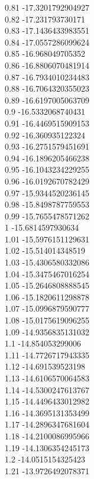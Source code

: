 {0.81	-17.3201792904927\\
0.82	-17.231793730171\\
0.83	-17.1436433983551\\
0.84	-17.0557286099624\\
0.85	-16.968049705352\\
0.86	-16.8806070481914\\
0.87	-16.7934010234483\\
0.88	-16.7064320355023\\
0.89	-16.6197005063709\\
0.9	-16.5332068740431\\
0.91	-16.4469515909153\\
0.92	-16.360935122324\\
0.93	-16.2751579451691\\
0.94	-16.1896205466238\\
0.95	-16.1043234229255\\
0.96	-16.0192670782429\\
0.97	-15.9344520236145\\
0.98	-15.8498787759553\\
0.99	-15.7655478571262\\
1	-15.6814597930634\\
1.01	-15.5976151129631\\
1.02	-15.514014348519\\
1.03	-15.4306580332086\\
1.04	-15.3475467016254\\
1.05	-15.2646808888545\\
1.06	-15.1820611298878\\
1.07	-15.0996879590777\\
1.08	-15.0175619096255\\
1.09	-14.9356835131032\\
1.1	-14.854053299006\\
1.11	-14.7726717943335\\
1.12	-14.691539523198\\
1.13	-14.6106570064583\\
1.14	-14.5300247613767\\
1.15	-14.4496433012982\\
1.16	-14.3695131353499\\
1.17	-14.2896347681604\\
1.18	-14.2100086995966\\
1.19	-14.1306354245173\\
1.2	-14.0515154325423\\
1.21	-13.9726492078371\\
}
